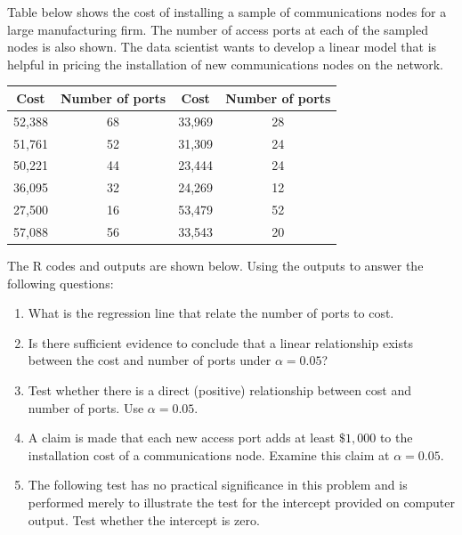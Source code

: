 \begin{example}
    Table below shows the cost of installing a sample of communications nodes for a large manufacturing firm. The number 
    of access ports at each of the sampled nodes is also shown. The data scientist wants to develop a linear model 
    that is helpful in pricing the installation of new communications nodes on the network.
    \begin{center}
        \begin{tabular}{cc|cc}
            Cost & Number of ports & Cost & Number of ports \\
            \hline
            52,388 & 68 & 33,969 & 28\\
            51,761 & 52 & 31,309 & 24\\
            50,221 & 44 & 23,444 & 24\\
            36,095 & 32 & 24,269 & 12\\
            27,500 & 16 & 53,479 & 52\\
            57,088 & 56 & 33,543 & 20\\
            \end{tabular}
    \end{center}
    The R codes and outputs are shown below. Using the outputs to answer the following questions:
    \begin{enumerate}
        \item What is the regression line that relate the number of ports to cost.
        \item Is there sufficient evidence to conclude that a linear relationship exists between the cost and number of ports 
            under $\alpha = 0.05$?
        \item Test whether there is a direct (positive) relationship between cost and number of ports. Use $\alpha =0.05$.
        \item A claim is made that each new access port adds at least $\$1,000$ to the installation cost of a communications node. 
            Examine this claim at $\alpha = 0.05$.
        \item The following test has no practical significance in this problem and is performed merely to illustrate the test for the intercept provided on 
            computer output. Test whether the intercept is zero.
    \end{enumerate}
\end{example}

